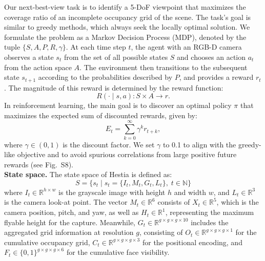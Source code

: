 Our next-best-view task is to identify a 5-DoF viewpoint that maximizes the coverage ratio of an incomplete occupancy grid of the scene. 
The task's goal is similar to greedy methods, which always seek the locally optimal solution.
We formulate the problem as a Markov Decision Process (MDP), denoted by the tuple $\{S, A, P, R, \gamma\}$. 
At each time step $t$, the agent with an RGB-D camera observes a state $s_t$ from the set of all possible states $S$ and chooses an action $a_t$ from the action space $A$. 
The environment then transitions to the subsequent state $s_{t+1}$ according to the probabilities described by $P$, and provides a reward $r_t$.
The magnitude of this reward is determined by the reward function: %
\begin{equation}\label{eq:reward_function}
     R(\cdot \mid s, a): S \times A \to r.
\end{equation}
In reinforcement learning, the main goal is to discover an optimal policy $\pi$ that maximizes the expected sum of discounted rewards, given by: %
\begin{equation}\label{eq:discounted_reward}
     E_t = \sum_{k=0}^{\infty} \gamma^k r_{t+k},
\end{equation}
where $\gamma \in (0, 1)$ is the discount factor.
We set $\gamma$ to 0.1 to align with the greedy-like objective and to avoid spurious correlations from large positive future rewards (see Fig.~S8).
\\
\textbf{State space.} The state space of Hestia is defined as: %
\begin{equation}\label{eq:state_space_hestia}
 S = \Big\{ s_t \;\Big|\; s_t = \big\{ I_t, M_t, G_t, L_t \big\}, \; t \in \mathbb{N} \Big\}
 \end{equation}
where $I_t \in \mathbb{R}^{h \times w}$ is the grayscale image with height $h$ and width $w$, and $L_t \in \mathbb{R}^{3}$ is the camera look-at point. 
The vector $M_t \in \mathbb{R}^{6}$ consists of $X_t \in \mathbb{R}^{5}$, which is the camera position, pitch, and yaw, as well as $H_t \in \mathbb{R}^{1}$, representing the maximum flyable height for the capture. 
Meanwhile, $G_t \in \mathbb{R}^{g \times g \times g \times 10}$ includes the aggregated grid information at resolution $g$, consisting of $O_t \in \mathbb{R}^{g \times g \times g \times 1}$ for the cumulative occupancy grid, $C_t \in \mathbb{R}^{g \times g \times g \times 3}$ for the positional encoding, and $F_t \in \{0, 1\}^{g \times g \times g \times 6}$ for the cumulative face visibility.
